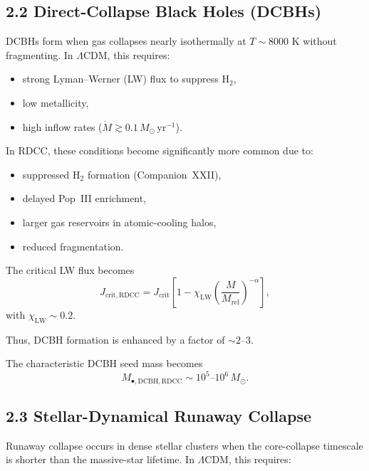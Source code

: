\documentclass[11pt,a4paper]{article}
\begin{document}
\subsection*{2.2 Direct-Collapse Black Holes (DCBHs)}

DCBHs form when gas collapses nearly isothermally at $T \sim 8000$ K without fragmenting. 
In $\Lambda$CDM, this requires:

\begin{itemize}
    \item strong Lyman–Werner (LW) flux to suppress $\mathrm{H}_2$,
    \item low metallicity,
    \item high inflow rates ($\dot{M} \gtrsim 0.1\,M_{\odot}\,\mathrm{yr}^{-1}$).
\end{itemize}

In RDCC, these conditions become significantly more common due to:

\begin{itemize}
    \item suppressed $\mathrm{H}_2$ formation (Companion~XXII),
    \item delayed Pop~III enrichment,
    \item larger gas reservoirs in atomic-cooling halos,
    \item reduced fragmentation.
\end{itemize}

The critical LW flux becomes
\begin{equation}
    J_{\mathrm{crit,RDCC}}
    = J_{\mathrm{crit}}
      \left[
        1 - \chi_{\mathrm{LW}}
        \left(\frac{M}{M_{\mathrm{rel}}}\right)^{-\alpha}
      \right],
\end{equation}
with $\chi_{\mathrm{LW}} \sim 0.2$.

Thus, DCBH formation is enhanced by a factor of $\sim 2$–$3$.

The characteristic DCBH seed mass becomes
\begin{equation}
    M_{\bullet,\mathrm{DCBH,RDCC}}
    \sim 10^{5}\text{--}10^{6}\,M_{\odot}.
\end{equation}

\subsection*{2.3 Stellar-Dynamical Runaway Collapse}

Runaway collapse occurs in dense stellar clusters when the core-collapse timescale is shorter 
than the massive-star lifetime. In $\Lambda$CDM, this requires:
\end{document}
